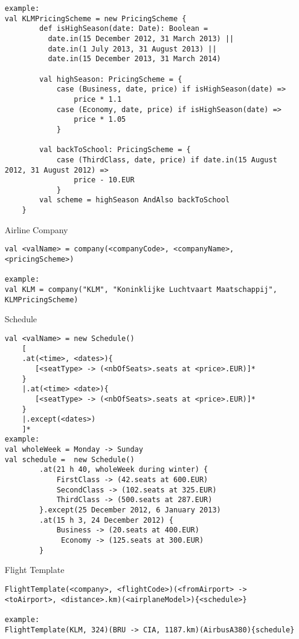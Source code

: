 \begin{itemize}
\begin{lstlisting}
example:
val KLMPricingScheme = new PricingScheme {
		def isHighSeason(date: Date): Boolean =
		  date.in(15 December 2012, 31 March 2013) ||
		  date.in(1 July 2013, 31 August 2013) ||
		  date.in(15 December 2013, 31 March 2014)

		val highSeason: PricingScheme = {
			case (Business, date, price) if isHighSeason(date) =>
			    price * 1.1
			case (Economy, date, price) if isHighSeason(date) =>
			    price * 1.05
			}
			    
		val backToSchool: PricingScheme = {
			case (ThirdClass, date, price) if date.in(15 August 2012, 31 August 2012) =>
			    price - 10.EUR
			}
		val scheme = highSeason AndAlso backToSchool
	}
\end{lstlisting}

\item[Airline Company]
\begin{lstlisting}
val <valName> = company(<companyCode>, <companyName>, <pricingScheme>)

example:
val KLM = company("KLM", "Koninklijke Luchtvaart Maatschappij", KLMPricingScheme)
\end{lstlisting}
	    
\item[Schedule]
\begin{lstlisting}
val <valName> = new Schedule()
	[
	.at(<time>, <dates>){
	   [<seatType> -> (<nbOfSeats>.seats at <price>.EUR)]*
	}
	|.at(<time> <date>){
	   [<seatType> -> (<nbOfSeats>.seats at <price>.EUR)]*
	}
	|.except(<dates>)
	]*
example:
val wholeWeek = Monday -> Sunday
val schedule =  new Schedule()
		.at(21 h 40, wholeWeek during winter) {
			FirstClass -> (42.seats at 600.EUR)
			SecondClass -> (102.seats at 325.EUR)
			ThirdClass -> (500.seats at 287.EUR)
		}.except(25 December 2012, 6 January 2013)
		.at(15 h 3, 24 December 2012) {
			Business -> (20.seats at 400.EUR)
			 Economy -> (125.seats at 300.EUR)
		}
\end{lstlisting}

\item[Flight Template]
\begin{lstlisting}
FlightTemplate(<company>, <flightCode>)(<fromAirport> -> <toAirport>, <distance>.km)(<airplaneModel>){<schedule>}
		
example:
FlightTemplate(KLM, 324)(BRU -> CIA, 1187.km)(AirbusA380){schedule}
\end{lstlisting}

\end{itemize}
